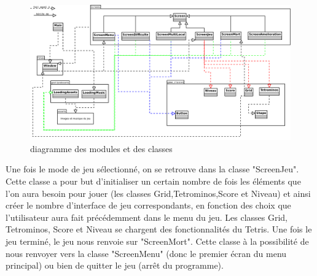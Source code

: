 \documentclass[a4paper, 11pt]{article}
\begin{document}
            \begin{figure}[ht]
        		\centering
        			\includegraphics[scale=0.35]{images/diaModClass.png} 
        		\caption{diagramme des modules et des classes}
    		\end{figure}
    		
    		\newpage
            Une fois le mode de jeu sélectionné, on se retrouve dans la classe "ScreenJeu". Cette classe a pour but d'initialiser un certain nombre de fois les éléments que l'on aura besoin pour jouer (les classes Grid,Tetrominos,Score et Niveau) et ainsi créer le nombre d'interface de jeu correspondants, en fonction des choix que l'utilisateur aura fait précédemment dans le menu du jeu. Les classes Grid, Tetrominos, Score et Niveau se chargent des fonctionnalités du Tetris. Une fois le jeu terminé, le jeu nous renvoie sur "ScreenMort". Cette classe à la possibilité de nous renvoyer vers la classe "ScreenMenu" (donc le premier écran du menu principal) ou bien de quitter le jeu (arrêt du programme). 
\end{document}
